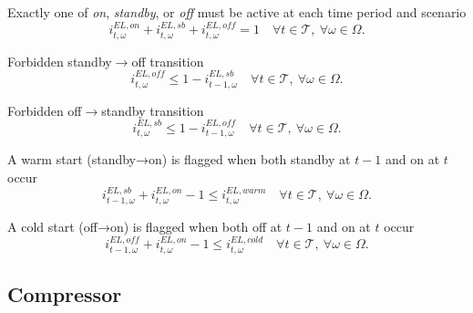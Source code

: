 \documentclass{article}
\begin{document}
Exactly one of \emph{on}, \emph{standby}, or \emph{off} must be active at each time period and scenario
\begin{equation} \label{EQ:EL_one_state}
    i^{EL,on}_{t,\omega} + i^{EL,sb}_{t,\omega} + i^{EL,off}_{t,\omega} = 1 \quad \forall t \in \mathcal{T}, \ \forall \omega \in \Omega.
\end{equation}

Forbidden standby$\rightarrow$off transition 
\begin{equation} \label{EQ:EL_no_sb_off1}
    i^{EL,off}_{t,\omega} \leq 1 - i^{EL,sb}_{t-1,\omega} \quad \forall t \in \mathcal{T}, \ \forall \omega \in \Omega.
\end{equation}

Forbidden off$\rightarrow$standby transition 
\begin{equation} \label{EQ:EL_no_sb_off2}
    i^{EL,sb}_{t,\omega} \leq 1 - i^{EL,off}_{t-1,\omega} \quad \forall t \in \mathcal{T}, \ \forall \omega \in \Omega.
\end{equation}

A warm start (standby→on) is flagged when both standby at $t-1$ and on at $t$ occur
\begin{equation} \label{EQ:EL_warm_lower}
    i^{EL,sb}_{t-1,\omega} + i^{EL,on}_{t,\omega} - 1 \leq i^{EL,warm}_{t,\omega} \quad \forall t \in \mathcal{T}, \ \forall \omega \in \Omega.
\end{equation}

A cold start (off→on) is flagged when both off at $t-1$ and on at $t$ occur
\begin{equation} \label{EQ:EL_cold_lower}
    i^{EL,off}_{t-1,\omega} + i^{EL,on}_{t,\omega} - 1 \leq i^{EL,cold}_{t,\omega} \quad \forall t \in \mathcal{T}, \ \forall \omega \in \Omega.
\end{equation}


\subsection{Compressor}
\label{SEC:Compressor}
\end{document}
